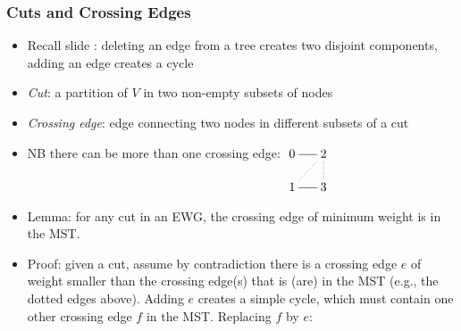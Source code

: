 \documentclass[handout]{beamer}
\begin{document}
\begin{frame}
    \frametitle{Cuts and Crossing Edges}

\begin{itemize}[<+->]
\item Recall slide \hyperlink{tree_characteristics}{\color{red}{\pageref{tree_characteristics}}}:
deleting an edge from a tree creates two disjoint components, adding an edge creates a cycle
\item \emph{Cut}: a partition of $V$ in two non-empty subsets of nodes 
\item \emph{Crossing edge}: edge connecting two nodes in different subsets of a cut

\item NB there can be more than one crossing edge: $\xymatrix@R=.5cm@C=.5cm{
0\ar@{-}[r]&2 \ar@{.}[d]\\1\ar@{-}[r] \ar@{.}[ru] &3 }$
\item Lemma: for any cut in an EWG, the crossing edge of minimum weight is in the MST.
\item Proof: given a cut, assume by contradiction
there is a crossing edge $e$ of weight smaller than the crossing
edge(s) that is (are) in the MST (e.g., the dotted edges above). Adding $e$ creates a simple cycle,
which must contain one other crossing edge $f$ in the MST. Replacing $f$ by $e$: \Lightning
\end{itemize} 
\end{frame}
\end{document}
